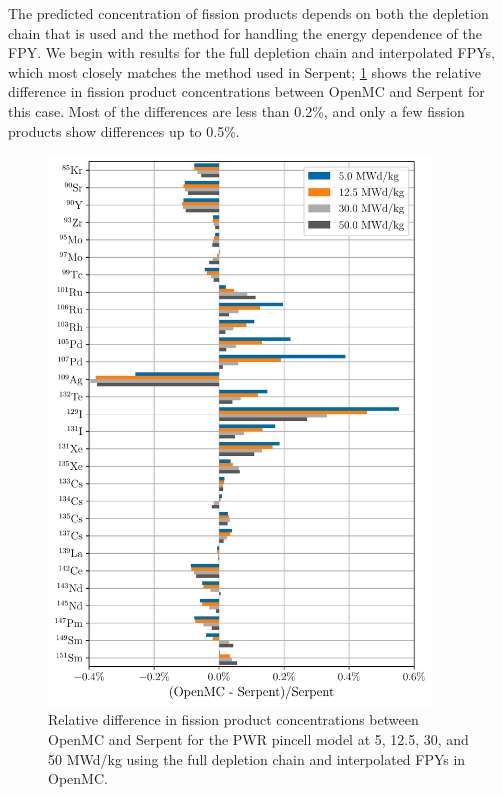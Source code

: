 \documentclass[3p,authoryear]{elsarticle}
\begin{document}
The predicted concentration of fission products depends on both the depletion
chain that is used and the method for handling the energy dependence of the FPY.
We begin with results for the full depletion chain and interpolated FPYs, which
most closely matches the method used in Serpent; \cref{fig:pwr-fp-full-average}
shows the relative difference in fission product concentrations between OpenMC
and Serpent for this case. Most of the differences are less than 0.2\%, and only
a few fission products show differences up to 0.5\%.
\begin{figure}[H]
  \centering
  \includegraphics[width=4in]{figures/pwr_fp_full_average.pdf}
  \caption{Relative difference in fission product concentrations between OpenMC
  and Serpent for the PWR pincell model at 5, 12.5, 30, and 50 MWd/kg using the
  full depletion chain and interpolated FPYs in OpenMC.}
  \label{fig:pwr-fp-full-average}
\end{figure}
\end{document}
